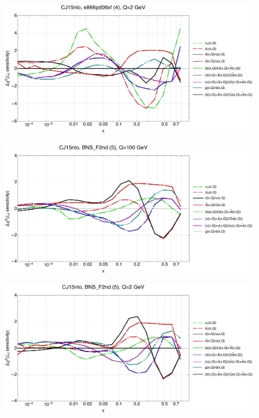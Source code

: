 \documentclass[10pt,aps,prd,floatfix,titlepage]{revtex4}
\begin{document}
\begin{figure}
\includegraphics[width=\textwidth,height=0.44\textheight,keepaspectratio]{2/4_CJ15nlo_q2_Sf_2.pdf}
\caption{}
\end{figure}
\clearpage
\begin{figure}
\includegraphics[width=\textwidth,height=0.44\textheight,keepaspectratio]{2/5_CJ15nlo_q100_Sf_2.pdf}
\caption{}
\end{figure}
\begin{figure}
\includegraphics[width=\textwidth,height=0.44\textheight,keepaspectratio]{2/5_CJ15nlo_q2_Sf_2.pdf}
\caption{}
\end{figure}
\end{document}
